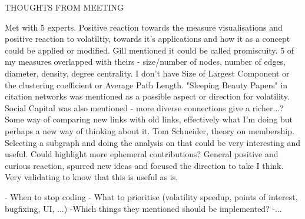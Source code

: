 




THOUGHTS FROM MEETING

Met with 5 experts. Positive reaction towards the measure visualisations and positive reaction to volatiltiy, towards it's applications and how it as a concept could be applied or modified.
Gill mentioned it could be called promiscuity.
5 of my measures overlapped with theirs - size/number of nodes, number of edges, diameter, density, degree centrality. I don't have Size of Largest Component or the clustering coefficient or Average Path Length. "Sleeping Beauty Papers" in citation networks was mentioned as a possible aspect or direction for volatility. Social Capital was also mentioned - more diverse connections give a richer...? Some way of comparing new links with old links, effectively what I'm doing but perhaps a new way of thinking about it. Tom Schneider, theory on membership. Selecting a subgraph and doing the analysis on that could be very interesting and useful. Could highlight more ephemeral contributions? 
General positive and curious reaction, spurred new ideas and focused the direction to take I think. Very validating to know that this is useful as is. 

- When to stop coding
- What to prioritise (volatility speedup, points of interest, bugfixing, UI, ...)
-Which things they mentioned should be implemented?
-...